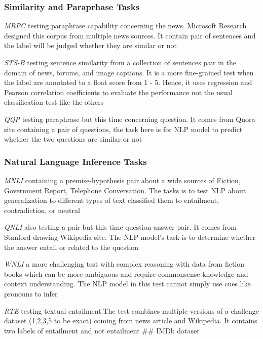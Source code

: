 \documentclass[
  11pt,
]{article}
\begin{document}
\hypertarget{similarity-and-paraprhase-tasks}{%
\subsubsection{Similarity and Paraprhase
Tasks}\label{similarity-and-paraprhase-tasks}}

\emph{MRPC} testing paraphrase capability concerning the news. Microsoft
Research designed this corpus from multiple news sources. It contain
pair of sentences and the label will be judged whether they are similar
or not

\emph{STS-B} testing sentence similarity from a collection of sentences
pair in the domain of news, forums, and image captions. It is a more
fine-grained test when the label are annotated to a float score from 1 -
5. Hence, it uses regression and Pearson correlation coefficients to
evaluate the performance not the usual classification test like the
others

\emph{QQP} testing paraphrase but this time concerning question. It
comes from Quora site containing a pair of questions, the task here is
for NLP model to predict whether the two questions are similar or not

\hypertarget{natural-language-inference-tasks}{%
\subsubsection{Natural Language Inference
Tasks}\label{natural-language-inference-tasks}}

\emph{MNLI} containing a premise-hypothesis pair about a wide sources of
Fiction, Government Report, Telephone Conversation. The tasks is to test
NLP about generalization to different types of text classified them to
entailment, contradiction, or neutral

\emph{QNLI} also testing a pair but this time question-answer pair. It
comes from Stanford drawing Wikipedia site. The NLP model's task is to
determine whether the answer entail or related to the question

\emph{WNLI} a more challenging test with complex reasoning with data
from fiction books which can be more ambiguous and require commonsense
knowledge and context understanding. The NLP model in this test cannot
simply use cues like pronouns to infer

\emph{RTE} testing textual entailment.The test combines multiple
versions of a challenge dataset (1,2,3,5 to be exact) coming from news
article and Wikipedia. It contains two labels of entailment and not
entailment \#\# IMDb dataset
\end{document}
